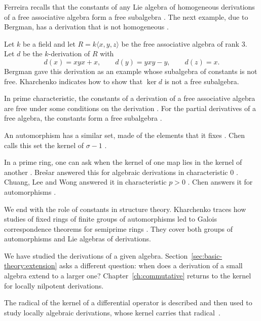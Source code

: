Ferreira recalls that the constants of any Lie algebra of homogeneous
derivations of a free associative algebra form a free subalgebra
\cite[p.~177]{Ferreira2002}. The next example, due to Bergman, has a derivation
that is not homogeneous \cite[p.~177]{Ferreira2002}.

\begin{example}\label{ex:basic:bergman}
Let $k$ be a field and let $R=k\langle x,y,z\rangle$ be the free associative
algebra of rank $3$. Let $d$ be the $k$-derivation of $R$ with
\[
d(x)=xyx+x,\qquad d(y)=yxy-y,\qquad d(z)=x .
\]
Bergman gave this derivation as an example whose subalgebra of constants is not
free. Kharchenko indicates how to show that $\ker d$ is not a free subalgebra.
\end{example}

In prime characteristic, the constants of a derivation of a free associative
algebra are free under some conditions on the derivation
\cite[p.~177]{Ferreira2002}. For the partial derivatives of a free algebra,
the constants form a free subalgebra \cite[p.~177]{Ferreira2002}.

An automorphism has a similar set, made of the elements that it fixes
\cite[p.~1365]{Chen2011}. Chen calls this set the kernel of $\sigma-1$
\cite[p.~1365]{Chen2011}.

In a prime ring, one can ask when the kernel of one map lies in the kernel of
another \cite[p.~1365]{Chen2011}. Bre\v{s}ar answered this for algebraic derivations in characteristic
$0$ \cite[p.~1365]{Chen2011}. Chuang, Lee and Wong answered it in characteristic
$p>0$ \cite[p.~1365]{Chen2011}. Chen answers it for automorphisms
\cite[Theorem~1.1, p.~1366]{Chen2011}.

We end with the role of constants in structure theory. Kharchenko traces how studies of fixed rings of finite groups of automorphisms led to Galois correspondence theorems for semiprime rings \cite[Introduction]{Kharchenko1991}. They cover both groups of automorphisms and Lie algebras of derivations.

We have studied the derivations of a given algebra. Section~\ref{sec:basic-theory:extension}
asks a different question: when does a derivation of a small algebra extend to a
larger one? Chapter~\ref{ch:commutative} returns to the kernel for locally
nilpotent derivations.

The radical of the kernel of a differential operator is described and then used to study locally algebraic derivations, whose kernel carries that radical~\cite{WlTheRadicalOf2017}.
